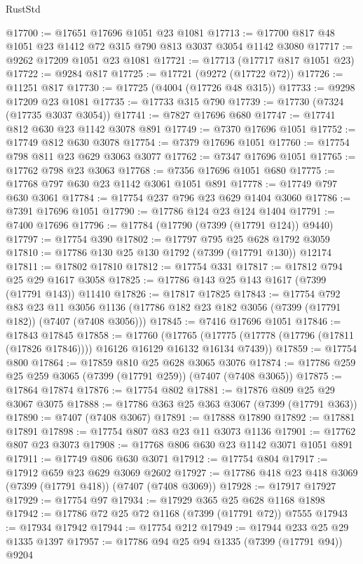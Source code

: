 \begin{lexlean}{RustStd}
\begin{coremodule}
@17700 := @17651 @17696 @1051 @23 @1081
@17713 := @17700 @817 @48 @1051 @23 @1412 @72 @315 @790 @813 @3037 @3054 @1142 @3080
@17717 := @9262 @17209 @1051 @23 @1081
@17721 := @17713 (@17717 @817 @1051 @23)
@17722 := @9284 @817
@17725 := @17721 (@9272 (@17722 @72))
@17726 := @11251 @817
@17730 := @17725 (@4004 (@17726 @48 @315))
@17733 := @9298 @17209 @23 @1081
@17735 := @17733 @315 @790
@17739 := @17730 (@7324 (@17735 @3037 @3054))
@17741 := @7827 @17696 @680
@17747 := @17741 @812 @630 @23 @1142 @3078 @891
@17749 := @7370 @17696 @1051
@17752 := @17749 @812 @630 @3078
@17754 := @7379 @17696 @1051
@17760 := @17754 @798 @811 @23 @629 @3063 @3077
@17762 := @7347 @17696 @1051
@17765 := @17762 @798 @23 @3063
@17768 := @7356 @17696 @1051 @680
@17775 := @17768 @797 @630 @23 @1142 @3061 @1051 @891
@17778 := @17749 @797 @630 @3061
@17784 := @17754 @237 @796 @23 @629 @1404 @3060
@17786 := @7391 @17696 @1051
@17790 := @17786 @124 @23 @124 @1404
@17791 := @7400 @17696
@17796 := @17784 (@17790 (@7399 (@17791 @124)) @9440)
@17797 := @17754 @390
@17802 := @17797 @795 @25 @628 @1792 @3059
@17810 := @17786 @130 @25 @130 @1792 (@7399 (@17791 @130)) @12174
@17811 := @17802 @17810
@17812 := @17754 @331
@17817 := @17812 @794 @25 @29 @1617 @3058
@17825 := @17786 @143 @25 @143 @1617 (@7399 (@17791 @143)) @11410
@17826 := @17817 @17825
@17843 := @17754
    @792
    @83
    @23
    @11
    @3056
    @1136
    (@17786 @182 @23 @182 @3056 (@7399 (@17791 @182)) (@7407 (@7408 @3056)))
@17845 := @7416 @17696 @1051
@17846 := @17843 @17845
@17858 := @17760
    (@17765 (@17775 (@17778 (@17796 (@17811 (@17826 @17846)))) @16126 @16129 @16132 @16134 @7439))
@17859 := @17754 @800
@17864 := @17859 @810 @25 @628 @3065 @3076
@17874 := @17786 @259 @25 @259 @3065 (@7399 (@17791 @259)) (@7407 (@7408 @3065))
@17875 := @17864 @17874
@17876 := @17754 @802
@17881 := @17876 @809 @25 @29 @3067 @3075
@17888 := @17786 @363 @25 @363 @3067 (@7399 (@17791 @363))
@17890 := @7407 (@7408 @3067)
@17891 := @17888 @17890
@17892 := @17881 @17891
@17898 := @17754 @807 @83 @23 @11 @3073 @1136
@17901 := @17762 @807 @23 @3073
@17908 := @17768 @806 @630 @23 @1142 @3071 @1051 @891
@17911 := @17749 @806 @630 @3071
@17912 := @17754 @804
@17917 := @17912 @659 @23 @629 @3069 @2602
@17927 := @17786 @418 @23 @418 @3069 (@7399 (@17791 @418)) (@7407 (@7408 @3069))
@17928 := @17917 @17927
@17929 := @17754 @97
@17934 := @17929 @365 @25 @628 @1168 @1898
@17942 := @17786 @72 @25 @72 @1168 (@7399 (@17791 @72)) @7555
@17943 := @17934 @17942
@17944 := @17754 @212
@17949 := @17944 @233 @25 @29 @1335 @1397
@17957 := @17786 @94 @25 @94 @1335 (@7399 (@17791 @94)) @9204

\end{coremodule}
\end{lexlean}
